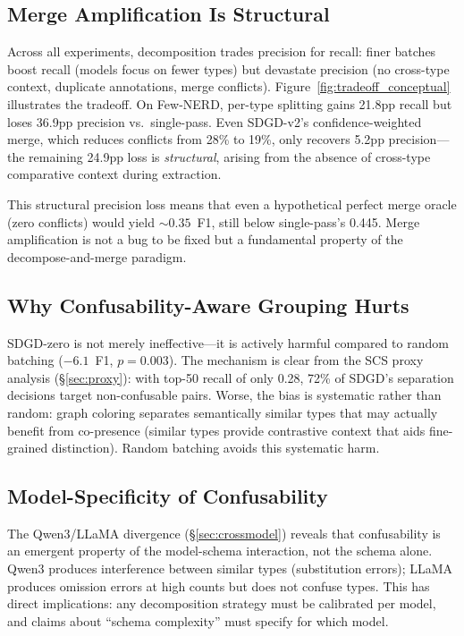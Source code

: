 \documentclass[11pt,a4paper]{article}
\begin{document}
\subsection{Merge Amplification Is Structural}

Across all experiments, decomposition trades precision for recall: finer batches boost recall (models focus on fewer types) but devastate precision (no cross-type context, duplicate annotations, merge conflicts). Figure~\ref{fig:tradeoff_conceptual} illustrates the tradeoff. On Few-NERD, per-type splitting gains 21.8pp recall but loses 36.9pp precision vs.\ single-pass. Even SDGD-v2's confidence-weighted merge, which reduces conflicts from 28\% to 19\%, only recovers 5.2pp precision---the remaining 24.9pp loss is \emph{structural}, arising from the absence of cross-type comparative context during extraction.

This structural precision loss means that even a hypothetical perfect merge oracle (zero conflicts) would yield ${\sim}0.35$~F1, still below single-pass's 0.445. Merge amplification is not a bug to be fixed but a fundamental property of the decompose-and-merge paradigm.

\subsection{Why Confusability-Aware Grouping Hurts}

SDGD-zero is not merely ineffective---it is actively harmful compared to random batching ($-6.1$~F1, $p{=}0.003$). The mechanism is clear from the SCS proxy analysis (\S\ref{sec:proxy}): with top-50 recall of only 0.28, 72\% of SDGD's separation decisions target non-confusable pairs. Worse, the bias is systematic rather than random: graph coloring separates semantically similar types that may actually benefit from co-presence (similar types provide contrastive context that aids fine-grained distinction). Random batching avoids this systematic harm.

\subsection{Model-Specificity of Confusability}

The Qwen3/LLaMA divergence (\S\ref{sec:crossmodel}) reveals that confusability is an emergent property of the model-schema interaction, not the schema alone. Qwen3 produces interference between similar types (substitution errors); LLaMA produces omission errors at high counts but does not confuse types. This has direct implications: any decomposition strategy must be calibrated per model, and claims about ``schema complexity'' must specify for which model.
\end{document}
